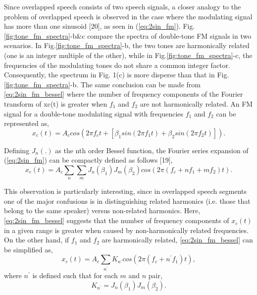 {Since overlapped speech consists of two speech signals, a closer analogy to the problem of overlapped speech is observed in the case where the modulating signal has more than one sinusoid [20], as seen in (\ref{eq:2sin_fm}). 
Fig.\ref{fig:tone_fm_spectra}-b\&c compare the spectra of double-tone FM signals in two scenarios. 
In Fig.\ref{fig:tone_fm_spectra}-b, the two tones are harmonically related (one is an integer multiple of the other), while in Fig.\ref{fig:tone_fm_spectra}-c, the frequencies of the modulating tones do not share a common integer factor. 
Consequently, the spectrum in Fig. 1(c) is more disperse than that in Fig.\ref{fig:tone_fm_spectra}-b. 
The same conclusion can be made from \ref{eq:2sin_fm_bessel} where the number of frequency components of the Fourier transform of xc(t) is greater when $f_1$ and $f_2$ are not harmonically related. 
An FM signal for a double-tone modulating signal with frequencies $f_1$ and $f_2$ can be represented as,
\begin{equation}
\label{eq:2sin_fm}
x_c(t) = A_ccos(2\pi f_ct+[\beta_1 sin(2\pi f_1t) + \beta_2 sin(2\pi f_2t)]).
\end{equation}

Defining $J_n(.)$ as the nth order Bessel function, the Fourier series expansion of (\ref{eq:2sin_fm}) can be compactly defined as follows [19], 
\begin{equation}
\label{eq:2sin_fm_bessel}
x_c(t) = A_c\sum\limits_n\sum\limits_m J_n(\beta_1)J_m(\beta_2)cos(2\pi (f_c+nf_1+mf_2)t).
\end{equation}

This observation is particularly interesting, since in overlapped speech segments one of the major confusions is in distinguishing related harmonics (i.e. those that belong to the same speaker) versus non-related harmonics. 
Here, \ref{eq:2sin_fm_bessel} suggests that the number of frequency components of $x_c(t)$ in a given range is greater when caused by non-harmonically related frequencies. 
On the other hand, if $f_1$ and $f_2$ are harmonically related, \ref{eq:2sin_fm_bessel} can be simplified as, 
\begin{equation}
\label{eq:2sin_fm_bessel_simplified}
x_c(t) = A_c\sum\limits_{n^\prime} K_{n^\prime}cos(2\pi (f_c + n^\prime f_1)t),
\end{equation}
where $n^\prime$ is defined such that for each $m$ and $n$ pair,
\begin{equation}
\label{eq:knprime}
K_{n^\prime} = J_n(\beta_1)J_m(\beta_2). 
\end{equation}

}
